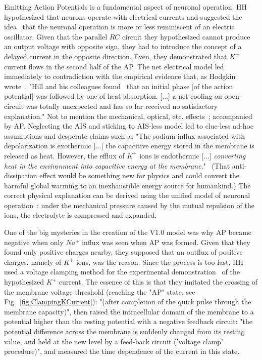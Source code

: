 Emitting Action Potentials is a fundamental aspect of neuronal operation.
\gls{HH} hypothesized that neurons operate with electrical currents and 
suggested the idea~\cite{HodgkinHuxley:1952} that the neuronal operation
is more or less reminiscent of an electric oscillator. Given that the parallel $RC$ circuit they hypothesized cannot produce an output voltage with opposite sign, they had to introduce
the concept of a delayed current in the opposite direction. Even, they demonstrated that $K^+$ current flows in the second half 
of the \gls{AP}. The net electrical model led immediately to contradiction with the empirical evidence that, 
as Hodgkin wrote~\cite{HodgkinConduction:1964}, "Hill and his colleagues found~\cite{HeatProductionNeuron:1958} that an initial phase [of the action potential] was followed by one of
heat absorption. [...] a net cooling on open-circuit was totally unexpected
and has so far received no satisfactory explanation."
Not to mention the mechanical, optical, etc. effects~\cite{MechanicalWaves:2015}; accompanied by \gls{AP}. 
Neglecting the \gls{AIS} and sticking to \gls{AIS}-less model 
led to clue-less ad-hoc assumptions and desperate claims such as 
"The sodium influx associated with
depolarization is exothermic  [...] the capacitive energy stored in the membrane is
released as heat. However, the efflux of $K^+$  ions is endothermic [...] \textit{converting heat in the environment
into capacitive energy at the membrane}."~\cite{MechanicalWaves:2015}
(That anti-dissipation effect would be something new for physics and could convert the harmful global warming to an
inexhaustible energy source for humankind.)
The correct physical explanation can be derived using the 
unified model of neuronal operation~\cite{Vegh2025ThermodynamicModel:2026,VeghUnifiedCrossdisciplinaryModel:2026}: under the mechanical pressure
caused by the mutual repulsion of the ions, the electrolyte
is compressed and expanded.

One of the big mysteries in the creation of the V1.0  model was why \gls{AP}
became negative when only
$Na^+$ influx was seen when \gls{AP} was formed. 
Given that they found only positive charges nearby, they supposed that
an outflux of positive charges, namely of $K^+$ ions,  was the reason.
Since the process is too fast, \gls{HH} used a voltage clamping method for the experimental demonstration~\cite{HodgkinHuxleyCurrent:1952} of the hypothesized  $K^+$ current. The essence of this is that they
imitated the crossing of the membrane voltage threshold (reaching the "AP" state, see Fig.~\ref{fig:ClampingKCurrent}):
"(after completion of the quick pulse through the membrane
capacity)", then raised the intracellular domain of the membrane to a potential higher than the resting potential with a negative feedback circuit:
"the potential
difference across the membrane is suddenly changed from its resting
value, and held at the new level by a feed-back circuit ('voltage clamp' procedure)", and measured the time dependence of the current in this state.

